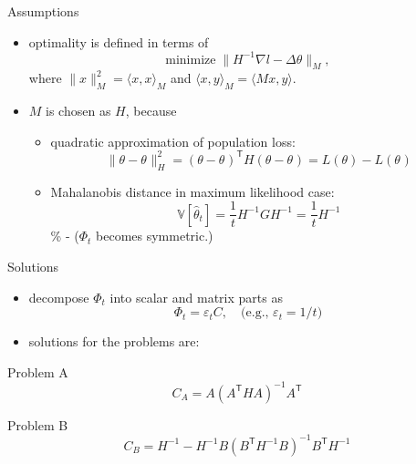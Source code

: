 \documentclass[fleqn,aspectratio=1610]{beamer}
\begin{document}
\begin{frame}[label={sec:org759f140}]{Assumptions}
\begin{itemize}
\item optimality is defined in terms of
\begin{equation}
  \text{minimize}\;\|H^{-1}\nabla l-\varDelta\theta\|_{M},
\end{equation}
where 
\(\|x\|_{M}^{2}=\langle x,x\rangle_{M}\)
and 
\(\langle x,y\rangle_{M}=\langle Mx,y\rangle\).
\item \(M\) is chosen as \(H\), because
\begin{itemize}
\item quadratic approximation of population loss:
\begin{equation}
  \|\theta-\theta_{}\|_{H}^{2}
  =(\theta-\theta_{})^{\mathsf{T}}H(\theta-\theta_{})
  =L(\theta)-L(\theta_{})
\end{equation}
\item Mahalanobis distance in maximum likelihood case:
\begin{equation}
  \mathbb{V}[\hat\theta_{t}]
  =\frac{1}{t}H^{-1}GH^{-1}
  =\frac{1}{t}H^{-1}
\end{equation}
\% - (\(\varPhi_{t}\) becomes symmetric.)
\end{itemize}
\end{itemize}
\end{frame}

\begin{frame}[label={sec:org2d8996f}]{Solutions}
\begin{itemize}
\item decompose \(\varPhi_{t}\) into scalar and matrix parts as
\begin{equation}
  \varPhi_{t}=\varepsilon_{t} C,\quad\text{(e.g., \(\varepsilon_{t}=1/t\))}
\end{equation}
\item solutions for the problems are:
\end{itemize}
\begin{block}{Problem A}
\begin{equation}
  C_{A}=A(A^{\mathsf{T}}HA)^{-1}A^{\mathsf{T}}
\end{equation}
\end{block}
\begin{block}{Problem B}
\begin{equation}
  C_{B}=H^{-1}-H^{-1}B(B^{\mathsf{T}}H^{-1}B)^{-1}B^{\mathsf{T}}H^{-1}
\end{equation}
\end{block}
\end{frame}
\end{document}
